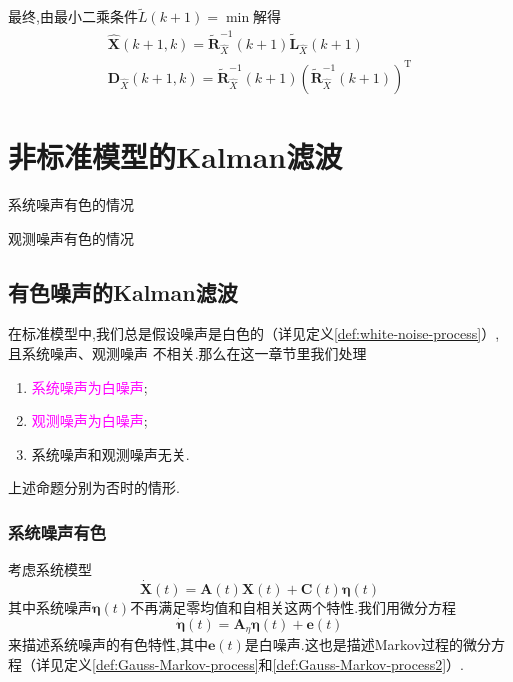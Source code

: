 \documentclass[cn,10pt,citestyle=gb7714-2015,bibstyle=gb7714-2015]{elegantbook}
\newcommand{\mT}{\mathrm{T}}
\begin{document}
最终,由最小二乘条件$\widetilde{L}(k+1)=\min$解得
\begin{gather}
  \hat{\bm{X}}(k+1,k)=\widetilde{\bm{R}}_{\hat{X}}^{-1}(k+1)\widetilde{\bm{L}}_{\hat{X}}(k+1)\\
  \bm{D}_{\hat{X}}(k+1,k)=\widetilde{\bm{R}}_{\hat{X}}^{-1}(k+1)\left(\widetilde{\bm{R}}_{\hat{X}}^{-1}(k+1)\right)^{\mT}
\end{gather}
\chapter{非标准模型的\textup{Kalman}滤波}
\begin{introduction}
  \item 系统噪声有色的情况
  \item 观测噪声有色的情况
\end{introduction}
\section{有色噪声的Kalman滤波}
在标准模型中,我们总是假设噪声是白色的（详见定义\ref{def:white-noise-process}）,且系统噪声、观测噪声
不相关.那么在这一章节里我们处理
\begin{enumerate}
  \item[\textcolor{magenta}{\HandRight}]\textcolor{magenta}{系统噪声为白噪声};
  \item[\textcolor{magenta}{\HandRight}]\textcolor{magenta}{观测噪声为白噪声};
  \item[{\HandRight}]{系统噪声和观测噪声无关}.
\end{enumerate}
上述命题分别为否时的情形.
\subsection{系统噪声有色}
考虑系统模型
\begin{equation}\label{eq:colored-system-noise-equation}
  \dot{\bm{X}}(t)=\bm{A}(t)\bm{X}(t)+\bm{C}(t)\bm{\eta}(t)
\end{equation}
其中系统噪声$\bm{\eta}(t)$不再满足零均值和自相关这两个特性.我们用微分方程
\begin{equation}\label{eq:colored-system-noise}
  \dot{\bm{\eta}}(t)=\bm{A}_\eta\bm{\eta}(t)+\bm{e}(t)
\end{equation}
来描述系统噪声的有色特性,其中$\bm{e}(t)$是白噪声.这也是描述Markov过程的微分方程（详见定义\ref{def:Gauss-Markov-process}和\ref{def:Gauss-Markov-process2}）.
\end{document}
